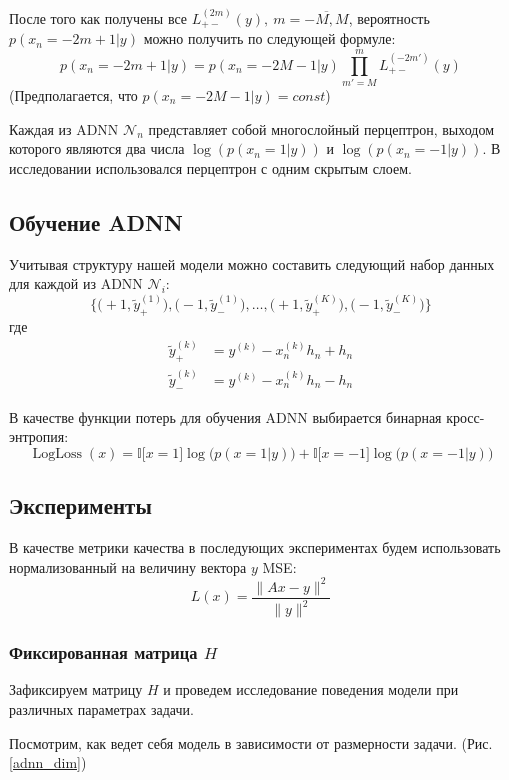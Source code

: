 \documentclass[12pt]{article}
\begin{document}
После того как получены все $L_{+-}^{(2m)}(y), \ m = \overline{-M, M}$, вероятность $p(x_n = - 2m + 1 | y)$ можно получить по следующей формуле:
    $$
    p( x_n = -2m + 1 | y) = p(x_n = -2M - 1 | y) \prod_{m' = M}^{m} L_{+-}^{(-2m')}(y)
    $$
(Предполагается, что $p(x_n = -2M - 1 | y) = const$)

Каждая из ADNN $\mathcal{N}_n$ представляет собой многослойный перцептрон, выходом которого являются два числа $\log(p(x_n = 1 | y))$ и $\log(p(x_n = -1 | y))$. В исследовании использовался перцептрон с одним скрытым слоем.

\subsection{Обучение ADNN}

Учитывая структуру нашей модели можно составить следующий набор данных для каждой из ADNN $\mathcal{N}_i$:
    $$
    \bigg\{ \Big( {+}1, \tilde y_+^{(1)} \Big), \Big( {-}1, \tilde y_-^{(1)} \Big), \ldots, \Big( {+}1, \tilde y_+^{(K)} \Big), \Big( {-}1, \tilde y_-^{(K)} \Big) \bigg\}
    $$
где
    $$
    \begin{aligned}
        \tilde y_+^{(k)} &= y^{(k)} - x_n^{(k)}h_n + h_n \\
        \tilde y_-^{(k)} &= y^{(k)} - x_n^{(k)}h_n - h_n
    \end{aligned}
    $$

В качестве функции потерь для обучения ADNN выбирается бинарная кросс-энтропия:
$$
\operatorname{LogLoss}(x) = \mathbb{I} \big [ x = 1 \big] \log \big( p(x = 1 | y) \big) + \mathbb{I} \big [ x = -1 \big] \log \big( p(x = -1 | y) \big)
$$

\subsection{Эксперименты}

В качестве метрики качества в последующих экспериментах будем использовать нормализованный на величину вектора $y$ MSE:
$$
L(x) = \frac{\|Ax - y\|^2}{\|y\|^2}
$$

\subsubsection{Фиксированная матрица \texorpdfstring{$H$}{H}}

Зафиксируем матрицу $H$ и проведем исследование поведения модели при различных параметрах задачи.

Посмотрим, как ведет себя модель в зависимости от размерности задачи. (Рис. \ref{adnn_dim}) 
\end{document}
